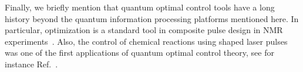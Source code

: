Finally, we briefly mention that quantum optimal control tools have a long history beyond the quantum information processing platforms mentioned here. In particular, optimization is a standard tool in composite pulse design in NMR experiments~\cite{bonnard2012}. Also, the control of chemical reactions using shaped laser pulses was one of the first applications of quantum optimal control theory, see for instance Ref.~\cite{tannor1985}.






